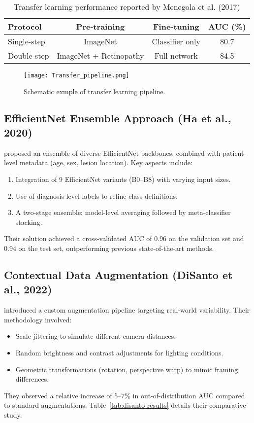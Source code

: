 \begin{table}[h!]
  \centering
  \caption{Transfer learning performance reported by Menegola et al. (2017)}
  \label{tab:menegola-results}
  \begin{tabular}{lccc}
    \hline
    Protocol & Pre-training & Fine-tuning & AUC (\%) \\
    \hline
    Single-step & ImageNet & Classifier only & 80.7 \\
    Double-step & ImageNet + Retinopathy & Full network & 84.5 \\
    \hline
  \end{tabular}
\end{table}

\begin{figure}[H]
  \centering
  \texttt{[image: Transfer\_pipeline.png]}
  \caption{Schematic exmple of transfer learning pipeline.}
  \label{fig:menegola-pipeline}
\end{figure}

\subsection{EfficientNet Ensemble Approach (Ha et al., 2020)}
\textcite{ha2020efficientnet} proposed an ensemble of diverse EfficientNet backbones, combined with patient-level metadata (age, sex, lesion location). Key aspects include:
\begin{enumerate}
  \item Integration of 9 EfficientNet variants (B0--B8) with varying input sizes.
  \item Use of diagnosis-level labels to refine class definitions.
  \item A two-stage ensemble: model-level averaging followed by meta-classifier stacking.
\end{enumerate}
Their solution achieved a cross-validated AUC of 0.96 on the validation set and 0.94 on the test set, outperforming previous state-of-the-art methods. 


\subsection{Contextual Data Augmentation (DiSanto et al., 2022)}
\textcite{disanto2022contextual} introduced a custom augmentation pipeline targeting real-world variability. Their methodology involved:
\begin{itemize}
  \item Scale jittering to simulate different camera distances.
  \item Random brightness and contrast adjustments for lighting conditions.
  \item Geometric transformations (rotation, perspective warp) to mimic framing differences.
\end{itemize}
They observed a relative increase of 5--7\% in out-of-distribution AUC compared to standard augmentations. Table~\ref{tab:disanto-results} details their comparative study.

